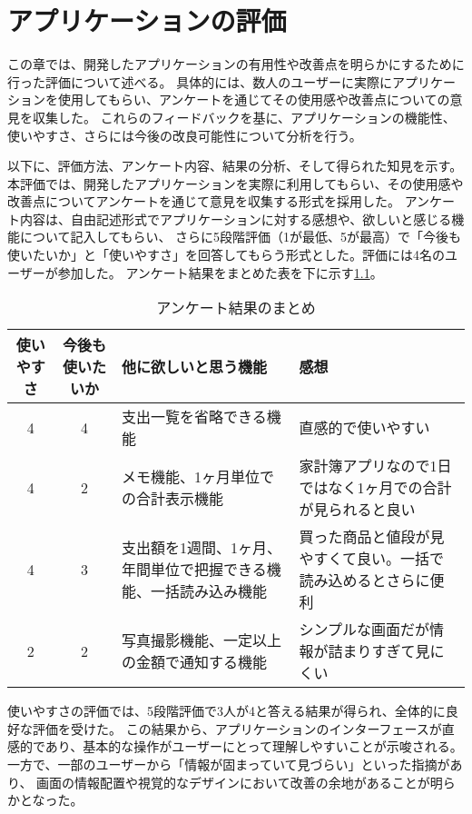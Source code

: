 \documentclass[main]{subfiles}
\begin{document}
\chapter{アプリケーションの評価}
\label{cha:evalidation}
この章では、開発したアプリケーションの有用性や改善点を明らかにするために行った評価について述べる。
具体的には、数人のユーザーに実際にアプリケーションを使用してもらい、アンケートを通じてその使用感や改善点についての意見を収集した。
これらのフィードバックを基に、アプリケーションの機能性、使いやすさ、さらには今後の改良可能性について分析を行う。

以下に、評価方法、アンケート内容、結果の分析、そして得られた知見を示す。
本評価では、開発したアプリケーションを実際に利用してもらい、その使用感や改善点についてアンケートを通じて意見を収集する形式を採用した。
アンケート内容は、自由記述形式でアプリケーションに対する感想や、欲しいと感じる機能について記入してもらい、
さらに5段階評価（1が最低、5が最高）で「今後も使いたいか」と「使いやすさ」を回答してもらう形式とした。評価には4名のユーザーが参加した。
アンケート結果をまとめた表を下に示す\ref{tab:survey_results}。

\begin{table}[tb]
    \caption{アンケート結果のまとめ}
    \label{tab:survey_results}
    \centering
    \begin{tabular}{|c|c|p{3cm}|p{3cm}|}
        \hline
        使いやすさ & 今後も使いたいか & 他に欲しいと思う機能 & 感想 \\
        \hline
        4 & 4 & 支出一覧を省略できる機能 & 直感的で使いやすい \\
        \hline
        4 & 2 & メモ機能、1ヶ月単位での合計表示機能 & 家計簿アプリなので1日ではなく1ヶ月での合計が見られると良い \\
        \hline
        4 & 3 & 支出額を1週間、1ヶ月、年間単位で把握できる機能、一括読み込み機能 & 買った商品と値段が見やすくて良い。一括で読み込めるとさらに便利 \\
        \hline
        2 & 2 & 写真撮影機能、一定以上の金額で通知する機能 & シンプルな画面だが情報が詰まりすぎて見にくい \\
        \hline
    \end{tabular}
\end{table}

使いやすさの評価では、5段階評価で3人が4と答える結果が得られ、全体的に良好な評価を受けた。
この結果から、アプリケーションのインターフェースが直感的であり、基本的な操作がユーザーにとって理解しやすいことが示唆される。
一方で、一部のユーザーから「情報が固まっていて見づらい」といった指摘があり、
画面の情報配置や視覚的なデザインにおいて改善の余地があることが明らかとなった。
\end{document}
